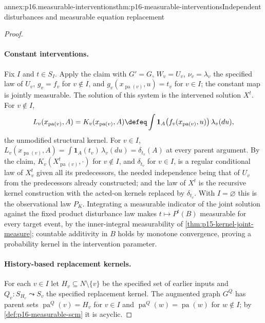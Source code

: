\begin{annexitem}{annex:p16.measurable-interventions}{thm:p16-measurable-interventions}{Independent disturbances and measurable equation replacement}
\begin{proof}
\paragraph{Constant interventions.}
Fix \(I\) and \(t\in S_I\). Apply the claim with \(G'=G\), \(W_v=U_v\),
\(\nu_v=\lambda_v\) the specified law of \(U_v\), \(g_v=f_v\) for
\(v\notin I\), and \(g_v(x_{\operatorname{pa}(v)},u)=t_v\) for \(v\in I\);
the constant map is jointly measurable. The solution of this system is
the intervened solution \(X^t\). For \(v\notin I\),
\[
 L_v(x_{\operatorname{pa}(v)},A)=K_v(x_{\operatorname{pa}(v)},A)
 \defeq\int\mathbf 1_A\bigl(f_v(x_{\operatorname{pa}(v)},u)\bigr)\,
       \lambda_v(du),
\]
the unmodified structural kernel. For \(v\in I\),
\(L_v(x_{\operatorname{pa}(v)},A)=\int\mathbf1_A(t_v)\,\lambda_v(du)
=\delta_{t_v}(A)\) at every parent argument. By the claim,
\(K_v(X^t_{\operatorname{pa}(v)},\cdot)\) for \(v\notin I\), and
\(\delta_{t_v}\) for \(v\in I\), is a regular conditional law of
\(X^t_v\) given all its predecessors, the needed independence being that
of \(U_v\) from the predecessors already constructed; and the law of
\(X^t\) is the recursive kernel construction with the acted-on kernels
replaced by \(\delta_{t_v}\). With \(I=\varnothing\) this is the
observational law \(P_K\).
Integrating a measurable indicator of the joint solution against
the fixed product disturbance law makes \(t\mapsto P^t(B)\)
measurable for every target event, by the inner-integral measurability
of \cref{thm:p15-kernel-joint-measure}; countable additivity in \(B\)
holds by monotone convergence, proving a probability kernel in the
intervention parameter.

\paragraph{History-based replacement kernels.}
For each \(v\in I\) let \(H_v\subseteq N\setminus\{v\}\) be the
specified set of earlier inputs and \(Q_v:S_{H_v}\leadsto S_v\) the
specified replacement kernel. The augmented graph \(G^Q\) has parent sets
\(\operatorname{pa}^Q(v)=H_v\) for \(v\in I\) and
\(\operatorname{pa}^Q(w)=\operatorname{pa}(w)\) for \(w\notin I\); by
\cref{def:p16-measurable-scm} it is acyclic.


\end{proof}
\end{annexitem}
